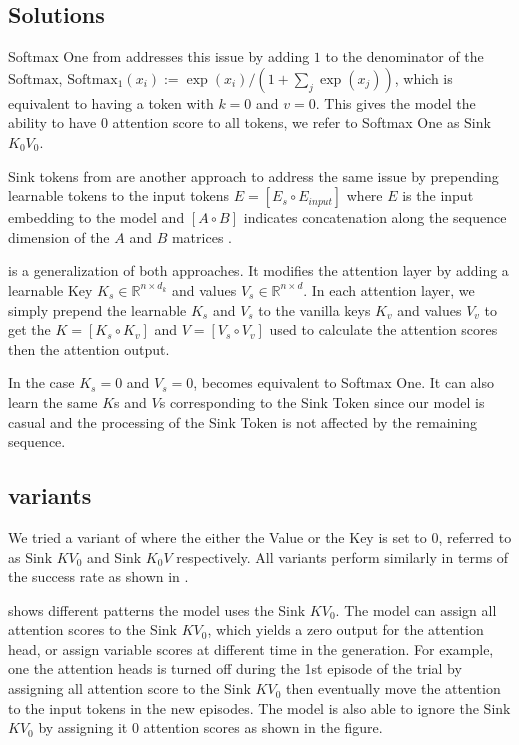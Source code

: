 \subsection{Solutions}
\label{sec:app-sinkkv-solutions}

Softmax One from \cite{off_by_one_softmax} addresses this issue by adding $1$ to the denominator of the $\text{Softmax}$, $\text{Softmax}_1(x_i) :=\exp(x_i)/(1+\sum_j{\exp(x_j)})$, which is equivalent to having a token with $k=0$ and $v=0$. This gives the model the ability to have 0 attention score to all tokens, we refer to Softmax One as Sink $K_0V_0$.

Sink tokens from \cite{xiao2023efficient} are another approach to address the same issue by prepending learnable tokens to the input tokens $E=[E_s \circ E_{input}]$ where $E$ is the input embedding to the model and $[A\circ B]$ indicates concatenation along the sequence dimension of the $A$ and $B$ matrices .

\sinkv is a generalization of both approaches. It modifies the attention layer by adding a learnable Key $K_s\in\mathbb{R}^{n\times d_k}$ and values $V_s\in\mathbb{R}^{n\times d}$. In each attention layer, we simply prepend the learnable $K_s$ and $V_s$ to the vanilla keys $K_v$ and values $V_v$ to get the $K=[K_s \circ K_v]$ and $V=[V_s \circ V_v]$ used to calculate the attention scores then the attention output. 

In the case $K_s=0$ and $V_s=0$, \sinkv becomes equivalent to Softmax One. It can also learn the same $K$s and $V$s corresponding to the Sink Token since our model is casual and the processing of the Sink Token is not affected by the remaining sequence.

\subsection{\sinkv variants}
We tried a variant of \sinkv where the either the Value or the Key is set to 0, referred to as Sink $KV_0$ and Sink $K_0V$ respectively. All variants perform similarly in terms of the success rate as shown in .


 shows different patterns the model uses the Sink $KV_0$. The model can assign all attention scores to the Sink $KV_0$, which yields a zero output for the attention head, or assign variable scores at different time in the generation. For example, one the attention heads is turned off during the 1st episode of the trial by assigning all attention score to the Sink $KV_0$ then eventually move the attention to the input tokens in the new episodes. The model is also able to ignore the Sink $KV_0$ by assigning it 0 attention scores as shown in the figure. 
